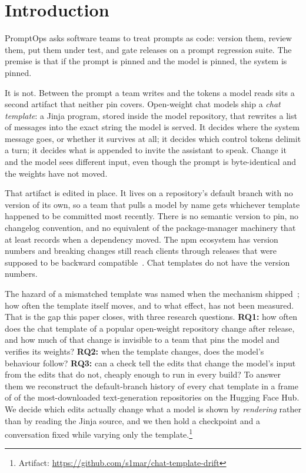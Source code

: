 \section{Introduction}

PromptOps asks software teams to treat prompts as code: version them, review them, put them under
test, and gate releases on a prompt regression suite. The premise is that if the prompt is pinned
and the model is pinned, the system is pinned.

It is not. Between the prompt a team writes and the tokens a model reads sits a second artifact that
neither pin covers. Open-weight chat models ship a \emph{chat template}: a Jinja program,
stored inside the model repository, that rewrites a list of messages into the exact string the model
is served. It decides where the system message goes, or whether it survives at all; it decides which
control tokens delimit a turn; it decides what is appended to invite the assistant to speak. Change
it and the model sees different input, even though the prompt is byte-identical and the weights have
not moved.

That artifact is edited in place. It lives on a repository's default branch with no version of its
own, so a team that pulls a model by name gets whichever template happened to be committed most
recently. There is no semantic version to pin, no changelog convention, and no equivalent of the
package-manager machinery that at least records when a dependency moved. The npm ecosystem has
version numbers and breaking changes still reach clients through releases that were supposed to be
backward compatible~\cite{venturini2023depended}. Chat templates do not have the version numbers.

The hazard of a mismatched template was named when the mechanism
shipped~\cite{carrigan2023chattemplates}; how often the template itself moves, and to what effect,
has not been measured. That is the gap this paper closes, with three research questions.
\textbf{RQ1:} how often does the chat template of a popular open-weight repository change after
release, and how much of that change is invisible to a team that pins the model and verifies its
weights? \textbf{RQ2:} when the template changes, does the model's behaviour follow? \textbf{RQ3:}
can a check tell the edits that change the model's input from the edits that do not, cheaply enough
to run in every build? To answer them we reconstruct the default-branch history of every chat
template in a frame of \NFrame{} of the most-downloaded text-generation repositories on the Hugging
Face Hub. We decide which edits actually change what a model is shown by \emph{rendering} rather
than by reading the Jinja source, and we then hold a checkpoint and a conversation fixed while
varying only the template.\footnote{Artifact: \url{https://github.com/s1mar/chat-template-drift}}

